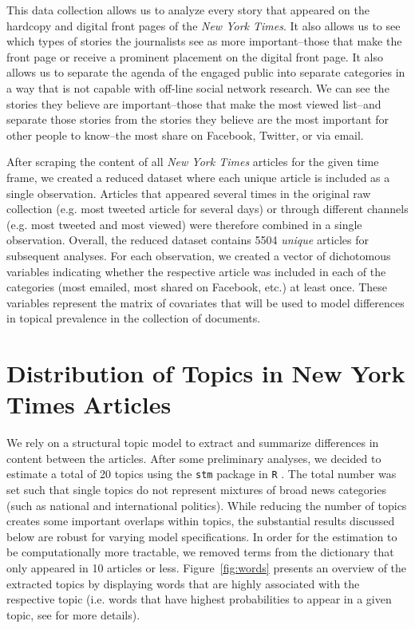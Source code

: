 \documentclass[12pt]{article}
\begin{document}
\begin{doublespace}
This data collection allows us to analyze every story that appeared on the hardcopy and digital front pages of the \textit{New York Times}. It also allows us to see which types of stories the journalists see as more important--those that make the front page or receive a prominent placement on the digital front page. It also allows us to separate the agenda of the engaged public into separate categories in a way that is not capable with off-line social network research. We can see the stories they believe are important--those that make the most viewed list--and separate those stories from the stories they believe are the most important for other people to know--the most share on Facebook, Twitter, or via email.

After scraping the content of all \textit{New York Times} articles for the given time frame, we created a reduced dataset where each unique article is included as a single observation. Articles that appeared several times in the original raw collection (e.g. most tweeted article for several days) or through different channels (e.g. most tweeted and most viewed) were therefore combined in a single observation. Overall, the reduced dataset contains 5504 \textit{unique} articles for subsequent analyses. For each observation, we created a vector of dichotomous variables indicating whether the respective article was included in each of the categories (most emailed, most shared on Facebook, etc.) at least once. These variables represent the matrix of covariates that will be used to model differences in topical prevalence in the collection of documents.


\section{Distribution of Topics in New York Times Articles}

We rely on a structural topic model to extract and summarize differences in content between the articles. After some preliminary analyses, we decided to estimate a total of 20 topics using the \texttt{stm} package in \texttt{R} \citep[using spectral initialization, see][]{roberts2014structural,roberts2014stm}. The total number was set such that single topics do not represent mixtures of broad news categories (such as national and international politics). While reducing the number of topics creates some important overlaps within topics, the substantial results discussed below are robust for varying model specifications. In order for the estimation to be computationally more tractable, we removed terms from the dictionary that only appeared in 10 articles or less. Figure~\ref{fig:words} presents an overview of the extracted topics by displaying words that are highly associated with the respective topic (i.e. words that have highest probabilities to appear in a given topic, see \citealt{roberts2014stm} for more details).


\end{doublespace}
\end{document}
